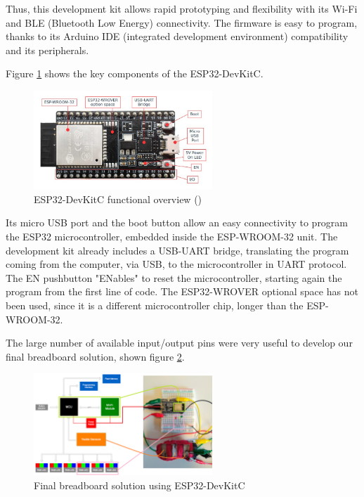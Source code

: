 \medskip Thus, this development kit allows rapid prototyping and flexibility with its Wi-Fi and BLE (Bluetooth Low Energy) connectivity. The firmware is easy to program, thanks to its Arduino IDE (integrated development environment) compatibility and its peripherals. 

\newpage Figure \ref{fig:ESP32-DevKitC_functional_overview} shows the key components of the ESP32-DevKitC.

\begin{figure}[H]
    \centering
    \includegraphics[width=0.6\textwidth]{images/EE_esp32-devkitc-functional-overview.jpg}
    \caption{ESP32-DevKitC functional overview (\cite{esp32gettingstartedguide})}
    \label{fig:ESP32-DevKitC_functional_overview}
\end{figure}

Its micro USB port and the boot button allow an easy connectivity to program the ESP32 microcontroller, embedded inside the ESP-WROOM-32 unit. The development kit already includes a USB-UART bridge, translating the program coming from the computer, via USB, to the microcontroller in UART protocol. The EN pushbutton "ENables" to reset the microcontroller, starting again the program from the first line of code. The ESP32-WROVER optional space has not been used, since it is a different microcontroller chip, longer than the ESP-WROOM-32. 

\medskip The large number of available input/output pins were very useful to develop our final breadboard solution, shown figure \ref{fig:ESP32_breadboard_solution}.

\begin{figure}[H]
    \centering
    \includegraphics[width=0.6\textwidth]{images/EE_ESP32_breadboard_solution.png}
    \caption{Final breadboard solution using ESP32-DevKitC}
    \label{fig:ESP32_breadboard_solution}
\end{figure}

